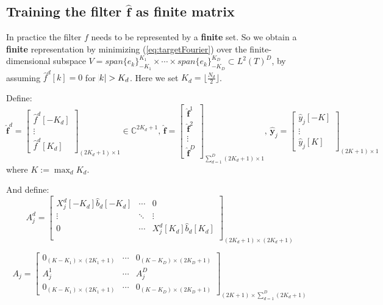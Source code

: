 \documentclass[12pt]{article}
\numberwithin{equation}{section}
\begin{document}
\subsection{Training the filter $\hat{\bm{f}}$ as finite matrix}
In practice the filter $f$ needs to be represented by a \textbf{finite} set. So we obtain a \textbf{finite} representation by minimizing (\ref{eq:targetFourier}) over the finite-dimensional subspace $V = span\{e_k\}^{K_1}_{-K_1} \times \cdots \times span\{e_k\}^{K_D}_{-K_D} \subset L^2(T)^D$, by assuming $\hat{f}^d[k] = 0$ for $\abs{k} > K_d$. Here we set $K_d = \lfloor \frac{N_d}{2} \rfloor$. \par
Define: 
\begin{equation}
	\hat{\bm{f}}^d= 
	\begin{bmatrix}
		\hat{f}^d[-K_d] \\  \vdots \\ \hat{f}^d[K_d] 
	\end{bmatrix}_{(2K_d+1) \times 1}
	 \in \mathbb{C}^{2K_d+1} \text{,   }
	\hat{\bm{f}}= 
	\begin{bmatrix}
		\hat{\bm{f}}^1 \\ \hat{\bm{f}}^2 \\ \vdots \\ \hat{\bm{f}}^D
	\end{bmatrix}_{\sum^{D}_{d=1}(2K_d+1) \times 1}
	 \text{,   }
	 \hat{\bm{y}}_j= 
	\begin{bmatrix}
		\hat{y}_j[-K] \\  \vdots \\ \hat{y}_j[K] 
	\end{bmatrix}_{(2K+1) \times 1}
\end{equation}
where $K:=\max_dK_d$.  \par
And define: 
\begin{equation}
	A^d_j = 
	\begin{bmatrix}
		X^d_j[-K_d]\hat{b}_d[-K_d] & \cdots & 0 \\
		\vdots & \ddots & \vdots \\
		0 & \cdots & X^d_j[K_d]\hat{b}_d[K_d] \\
	\end{bmatrix}_{(2K_d+1)\times(2K_d+1)}
\end{equation} \par
\begin{equation}
	A_j = 
	\begin{bmatrix}
		0_{(K-K_1)\times(2K_1+1)} & \cdots & 0_{(K-K_D)\times(2K_D+1)}  \\
		A_j^1 & \cdots & A_j^D \\
		0_{(K-K_1)\times(2K_1+1)} & \cdots & 0_{(K-K_D)\times(2K_D+1)} 
	\end{bmatrix}_{(2K+1)\times \sum^D_{d=1}(2K_d+1)}
\end{equation} \par
\end{document}
